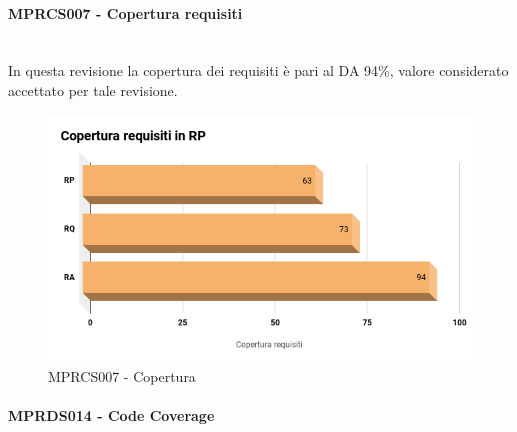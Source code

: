 \paragraph{MPRCS007 - Copertura requisiti}\mbox{}\\[0.4cm]
In questa revisione la copertura dei requisiti è pari al DA 94\%, valore considerato accettato per tale revisione.
\begin{figure}[H]
	\centering
	\includegraphics[width=13cm,keepaspectratio]{../includes/pics/CoperturaRP_RA.png}
	\caption{\label{fig:mission}MPRCS007 - Copertura}
\end{figure}
\paragraph{MPRDS014 - Code Coverage}\mbox{}\\[0.4cm]
\label{sec:CCRA}